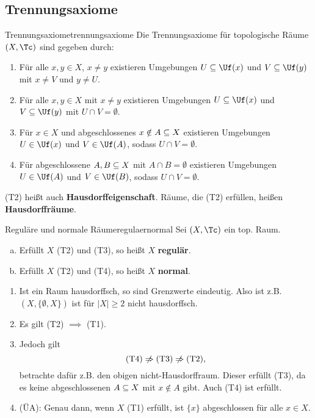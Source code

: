\subsection{Trennungsaxiome}
\label{subsec:trennungsaxiome}
\begin{definition}{Trennungsaxiome}{trennungsaxiome}
Die Trennungsaxiome für topologische Räume $(X,\Tc)$ sind gegeben durch:
\begin{enumerate}[({T}1)]
\item Für alle $x,y \in X$, $x \neq y$ existieren Umgebungen $U \sub \Uf(x)$ und $V \sub \Uf(y)$ mit $x \neq V$ und $y \neq U$.
\item Für alle $x,y \in X$ mit $x \neq y$ existieren Umgebungen $U \sub \Uf(x)$ und $V \sub \Uf(y)$ mit $U \cap V = \emptyset$.
\item Für $x \in X$ und abgeschlossenes $x \notin A \subseteq X$ existieren Umgebungen $U \in \Uf(x)$ und $V \in \Uf(A)$, sodass $U \cap V = \emptyset$.
\item Für abgeschlossene $A,B \subseteq X$ mit $A \cap B = \emptyset$ existieren Umgebungen $U \in \Uf(A)$ und $V \in \Uf(B)$, sodass $U \cap V = \emptyset$.
\end{enumerate}
(T2) heißt auch \textbf{Hausdorffeigenschaft}. Räume, die (T2) erfüllen, heißen \textbf{Hausdorffräume}.
\end{definition}
\begin{definition}{Reguläre und normale Räume}{regulaernormal}
Sei $(X, \Tc)$ ein top. Raum.
\begin{enumerate}[(a)]
\item Erfüllt $X$ (T2) und (T3), so heißt $X$ \textbf{regulär}.
\item Erfüllt $X$ (T2) und (T4), so heißt $X$ \textbf{normal}.
\end{enumerate}
\end{definition}
\begin{bemerkungen}
\begin{enumerate}
\item Ist ein Raum hausdorffsch, so sind Grenzwerte eindeutig. Also ist z.B. $(X, \{\emptyset, X\})$ ist für $|X| \geq 2$ nicht hausdorffsch.
\item Es gilt (T2) $\implies$ (T1).
\item Jedoch gilt
\begin{equation}
\text{(T4)} \centernot{\implies} \text{(T3)} \centernot{\implies} \text{(T2)},
\end{equation}
betrachte dafür z.B. den obigen nicht-Hausdorffraum. Dieser erfüllt (T3), da es keine abgeschlossenen $A \subseteq X$ mit $x \notin A$ gibt. Auch (T4) ist erfüllt.
\item (ÜA): Genau dann, wenn $X$ (T1) erfüllt, ist $\{x\}$ abgeschlossen für alle $x \in X$.
\end{enumerate}
\end{bemerkungen}
